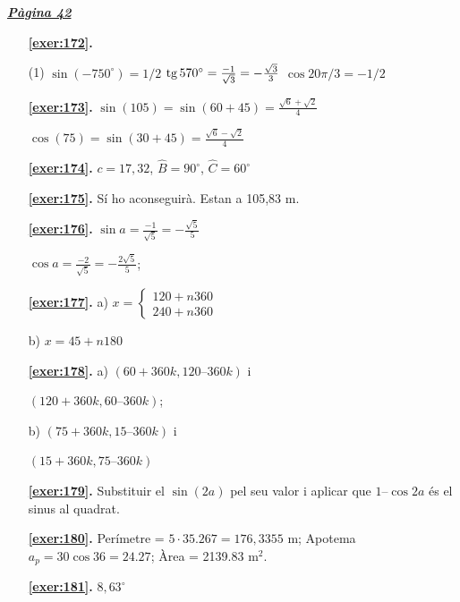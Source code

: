 \hyperlink{page.42}{\textbf{\em Pàgina 42}}
\begin{enumerate}



 \item[\fontfamily{phv}\selectfont\color{blue}\textbf{\ref{exer:172}. }] \label{ans:172}
 \begin{tasks}[column-sep=1em, item-indent=1.3333em](1)
	 \task $\sin (-750^\circ )=1/2$
	 \task* $\mathrm{tg}\, 570^\circ =\frac {-1}{\sqrt 3}=-\frac {\sqrt 3}{3}$
	 \task $\cos 20\pi /3 = -1/2$
\end{tasks}
 \end{enumerate}
\begin{enumerate}
\item[\fontfamily{phv}\selectfont\color{blue}\textbf{\ref{exer:173}. }] \label{ans:173} 
$\sin (105)=\sin (60+45)=\frac {\sqrt {6}+\sqrt {2}}{4}$ \par $\cos (75)=\sin (30+45)=\frac {\sqrt {6}-\sqrt {2}}{4}$
\item[\fontfamily{phv}\selectfont\color{blue}\textbf{\ref{exer:174}. }] \label{ans:174} 
$c=17,32$, $\hat B=90^\circ $, $\hat C=60^\circ $
\item[\fontfamily{phv}\selectfont\color{blue}\textbf{\ref{exer:175}. }] \label{ans:175} 
Sí ho aconseguirà. Estan a 105,83 m.
\item[\fontfamily{phv}\selectfont\color{blue}\textbf{\ref{exer:176}. }] \label{ans:176} 
$\sin a=\frac {-1}{\sqrt 5}=-\frac {\sqrt 5}{5}$\par $\cos a=\frac {-2}{\sqrt 5}=-\frac {2\sqrt 5}{5}$;
\item[\fontfamily{phv}\selectfont\color{blue}\textbf{\ref{exer:177}. }] \label{ans:177} 
a) $x=\left \{\begin {array}{l} 120 + n 360 \\ 240 +n 360 \end {array}\right .$ \par b) $x=45 + n 180$
\item[\fontfamily{phv}\selectfont\color{blue}\textbf{\ref{exer:178}. }] \label{ans:178} 
a) $(60+360k,120–360k)$ i \par $(120+360k,60–360k)$; \par b) $(75+360k, 15–360k)$ i \par $(15+360k, 75–360k)$
\item[\fontfamily{phv}\selectfont\color{blue}\textbf{\ref{exer:179}. }] \label{ans:179} 
Substituir el $\sin (2a)$ pel seu valor i aplicar que $1–\cos 2a$ és el sinus al quadrat.
\item[\fontfamily{phv}\selectfont\color{blue}\textbf{\ref{exer:180}. }] \label{ans:180} 
Perímetre = $5 \cdot 35.267 = 176,3355$ m; Apotema $a_p = 30 \cos 36 =24.27$; \quad Àrea = 2139.83 m$^2$.
\item[\fontfamily{phv}\selectfont\color{blue}\textbf{\ref{exer:181}. }] \label{ans:181} 
$8,63^\circ $
 \end{enumerate}

